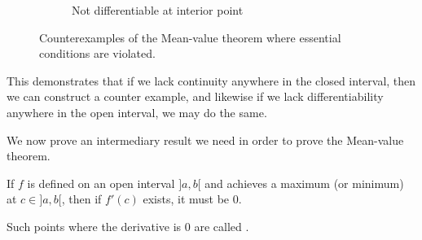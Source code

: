 \begin{figure}
\begin{subfigure}{0.3\textwidth}
		\centering
		\caption{Not differentiable at interior point}
	\end{subfigure}
	\caption{Counterexamples of the Mean-value theorem where essential conditions are violated.}
	\label{lec4:meanvalcounter}
\end{figure}


This demonstrates that if we lack continuity anywhere in the closed interval, then we can construct a counter example, and likewise if we lack differentiability anywhere in the open interval, we may do the same.

We now prove an intermediary result we need in order to prove the Mean-value theorem.

\begin{lemma}\label{lec4:criticalpoint}
	If $f$ is defined on an open interval ${]{a, b}[}$ and achieves a maximum (or minimum) at $c \in {]{a, b}[}$, then if $f'(c)$ exists, it must be $0$.
\end{lemma}

\noindent
Such points where the derivative is $0$ are called .

